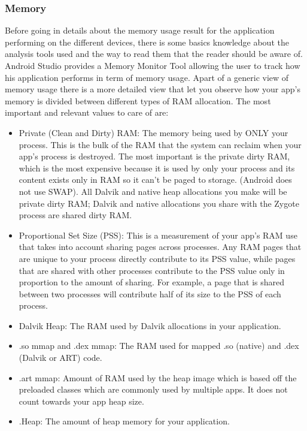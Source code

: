 \subsubsection{Memory}
Before going in details about the memory usage result for the application performing on the different devices, there is some basics knowledge about the analysis tools used and the way to read them that the reader should be aware of.\\
Android Studio provides a Memory Monitor Tool allowing the user to track how his application performs in term of memory usage. Apart of a generic view of memory usage there is a more detailed view that let you observe how your app’s memory is divided between different types of RAM allocation.
The most important and relevant values to care of are: 
\begin{itemize}
	\item Private (Clean and Dirty) RAM: The memory being used by ONLY your process. This is the bulk of the RAM that the system can reclaim when your app’s process is destroyed. The most important is the private dirty RAM, which is the most expensive because it is used by only your process and its content exists only in RAM so it can’t be paged to storage. (Android does not use SWAP). All Dalvik and native heap allocations you make will be private dirty RAM; Dalvik and native allocations you share with the Zygote process are shared dirty RAM.
	\item Proportional Set Size (PSS): This is a measurement of your app’s RAM use that takes into account sharing pages across processes. Any RAM pages that are unique to your process directly contribute to its PSS value, while pages that are shared with other processes contribute to the PSS value only in proportion to the amount of sharing. For example, a page that is shared between two processes will contribute half of its size to the PSS of each process.
	\item Dalvik Heap: The RAM used by Dalvik allocations in your application.
	\item .so mmap and .dex mmap: The RAM used for mapped .so (native) and .dex (Dalvik or ART) code.
	\item .art mmap: Amount of RAM used by the heap image which is based off the preloaded classes which are commonly used by multiple apps. It does not count towards your app heap size.
	\item .Heap: The amount of heap memory for your application.
\end{itemize}
